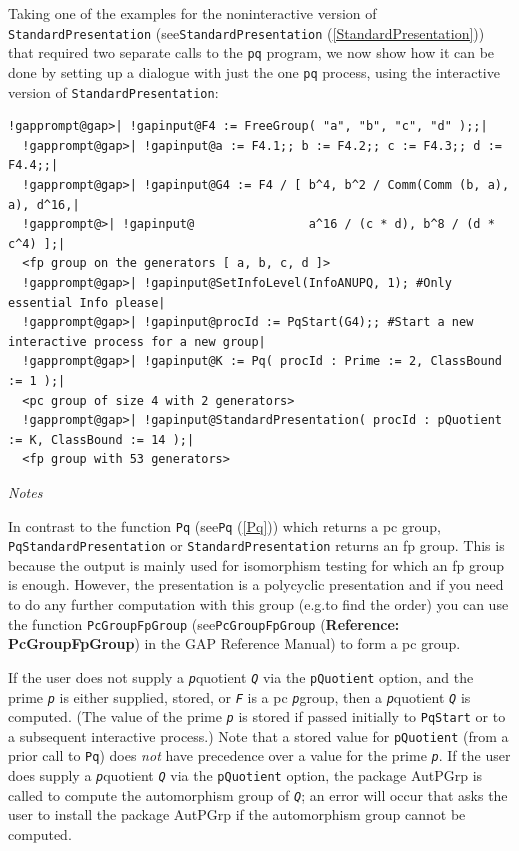 \documentclass[a4paper,11pt]{report}
\begin{document}
{{{ Taking one of the examples for the non\texttt{}interactive version
of \texttt{StandardPresentation} (see{\nobreakspace}\texttt{StandardPresentation} (\ref{StandardPresentation})) that required two separate calls to the \texttt{pq} program, we now show how it can be done by setting up a dialogue with just the
one \texttt{pq} process, using the interactive version of \texttt{StandardPresentation}: 
\begin{Verbatim}[commandchars=!@|,fontsize=\small,frame=single,label=Example]
  !gapprompt@gap>| !gapinput@F4 := FreeGroup( "a", "b", "c", "d" );;|
  !gapprompt@gap>| !gapinput@a := F4.1;; b := F4.2;; c := F4.3;; d := F4.4;;|
  !gapprompt@gap>| !gapinput@G4 := F4 / [ b^4, b^2 / Comm(Comm (b, a), a), d^16,|
  !gapprompt@>| !gapinput@                a^16 / (c * d), b^8 / (d * c^4) ];|
  <fp group on the generators [ a, b, c, d ]>
  !gapprompt@gap>| !gapinput@SetInfoLevel(InfoANUPQ, 1); #Only essential Info please|
  !gapprompt@gap>| !gapinput@procId := PqStart(G4);; #Start a new interactive process for a new group|
  !gapprompt@gap>| !gapinput@K := Pq( procId : Prime := 2, ClassBound := 1 );|
  <pc group of size 4 with 2 generators>
  !gapprompt@gap>| !gapinput@StandardPresentation( procId : pQuotient := K, ClassBound := 14 );|
  <fp group with 53 generators>
\end{Verbatim}
 \emph{Notes} 

 In contrast to the function \texttt{Pq} (see{\nobreakspace}\texttt{Pq} (\ref{Pq})) which returns a pc group, \texttt{PqStandardPresentation} or \texttt{StandardPresentation} returns an fp group. This is because the output is mainly used for isomorphism
testing for which an fp group is enough. However, the presentation is a
polycyclic presentation and if you need to do any further computation with
this group (e.g.{\nobreakspace}to find the order) you can use the function \texttt{PcGroupFpGroup} (see{\nobreakspace}\texttt{PcGroupFpGroup} (\textbf{Reference: PcGroupFpGroup}) in the \textsf{GAP} Reference Manual) to form a pc group. 

 If the user does not supply a \mbox{\texttt{\mdseries\slshape p}}\texttt{}quotient \mbox{\texttt{\mdseries\slshape Q}} via the \texttt{pQuotient} option, and the prime \mbox{\texttt{\mdseries\slshape p}} is either supplied, stored, or \mbox{\texttt{\mdseries\slshape F}} is a pc \mbox{\texttt{\mdseries\slshape p}}\texttt{}group, then a \mbox{\texttt{\mdseries\slshape p}}\texttt{}quotient \mbox{\texttt{\mdseries\slshape Q}} is computed. (The value of the prime \mbox{\texttt{\mdseries\slshape p}} is stored if passed initially to \texttt{PqStart} or to a subsequent interactive process.) Note that a stored value for \texttt{pQuotient} (from a prior call to \texttt{Pq}) does \emph{not} have precedence over a value for the prime \mbox{\texttt{\mdseries\slshape p}}. If the user does supply a \mbox{\texttt{\mdseries\slshape p}}\texttt{}quotient \mbox{\texttt{\mdseries\slshape Q}} via the \texttt{pQuotient} option, the package \textsf{AutPGrp} is called to compute the automorphism group of \mbox{\texttt{\mdseries\slshape Q}}; an error will occur that asks the user to install the package \textsf{AutPGrp} if the automorphism group cannot be computed. 

}}}
\end{document}
